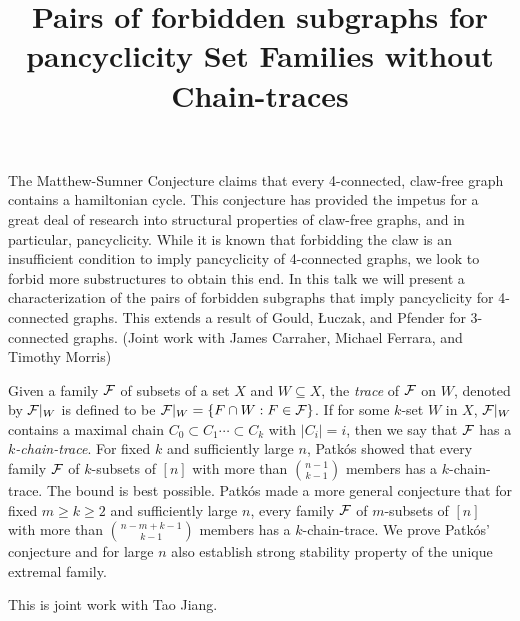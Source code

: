 \documentclass{article}
\def\cF{{\cal F}}
\begin{document}
\title{  Pairs of forbidden subgraphs for pancyclicity}
\endtitle
The Matthew-Sumner Conjecture claims that every 4-connected,
claw-free graph contains a hamiltonian cycle.  This conjecture has provided
the impetus for a great deal of research into structural properties of
claw-free graphs, and in particular, pancyclicity.  While it is known that
forbidding the claw is an insufficient condition to imply pancyclicity of
4-connected graphs, we look to forbid more substructures to obtain this end.
In this talk we will present a characterization of the pairs of forbidden
subgraphs that imply pancyclicity for 4-connected graphs.  This extends a
result of Gould, {\L}uczak, and Pfender for 3-connected graphs.  (Joint work
with James Carraher, Michael Ferrara, and Timothy Morris) 



\vspace{.25in}

\title{ Set Families without Chain-traces}
\endtitle
Given a family $\cF$ of subsets of a set $X$ and $W\subseteq X$, the {\it trace} of $\cF$ on $W$, denoted by $\cF|_W$ is defined to be  $\cF|_W=\{F\cap W: F\in \cF\}$. If for some $k$-set $W$ in $X$,
$\cF|_W$ contains a maximal chain $C_0\subset C_1\cdots \subset C_k$ with $|C_i|=i$,
then we say that $\cF$ has a {\it $k$-chain-trace}. For fixed $k$ and sufficiently large $n$, Patk\'os  showed that every family $\cF$ of $k$-subsets of $[n]$ with more than $\binom{n-1}{k-1}$ members
has a $k$-chain-trace. The bound is best possible. Patk\'os made a more general conjecture
that for fixed $m\geq k\geq 2$ and sufficiently large $n$, every family $\cF$ of $m$-subsets of $[n]$ with
more than $\binom{n-m+k-1}{k-1}$ members has a $k$-chain-trace. We prove Patk\'os' conjecture and for large $n$ also establish strong stability property of the unique
extremal family.

This is joint work with Tao Jiang.


\vspace{.25in}
\end{document}
